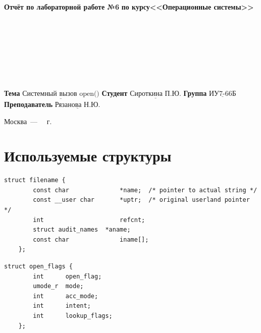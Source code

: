 \documentclass[12pt,a4paper]{scrreprt}
\begin{document}
\begin{titlepage}
		\begin{center}
			\noindent\begin{minipage}{1.3\textwidth}\centering
				\Large\textbf{  Отчёт по лабораторной работе №6}\newline
				\textbf{по курсу}\newline\textbf{<<Операционные системы>>}\newline
			\end{minipage}
		\end{center}
		
		~\\\\\\\\\\\\\\
		\normalsize
		\noindent\textbf{Тема } $\underline{\text{Системный вызов open()}}$\newline\newline
		\noindent\textbf{Студент } $\underline{\text{Сироткина П.Ю.}}$\newline\newline
		\noindent\textbf{Группа } $\underline{\text{ИУ7-66Б}}$\newline\newline
		\noindent\textbf{Преподаватель } $\underline{\text{Рязанова Н.Ю.}}$\newline
		
		\begin{center}
			\vfill
			Москва~---~\the\year
			~г.
		\end{center}
	\end{titlepage}
	
\chapter{Используемые структуры}

\begin{lstlisting}[caption={Структура filename}]
	struct filename {
		const char		    	*name;	/* pointer to actual string */
		const __user char		*uptr;	/* original userland pointer */
		int		       	    	refcnt;
		struct audit_names	*aname;
		const char		    	iname[];
	};
\end{lstlisting}

\begin{lstlisting}[caption={Структура open\_flags}]
	struct open_flags {
		int      open_flag;
		umode_r  mode;
		int      acc_mode;
		int      intent;
		int      lookup_flags;
	};
\end{lstlisting}
\end{document}
